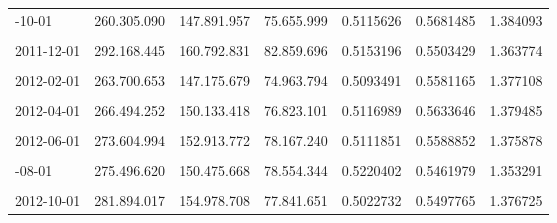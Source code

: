 \documentclass[12pt]{article}
\begin{document}
\begin{longtable}[t]{llllrrr}
\addlinespace
2011-10-01 & 260.305.090 & 147.891.957 & 75.655.999 & 0.5115626 & 0.5681485 & 1.384093\\
\cellcolor{gray!10}{2011-11-01} & \cellcolor{gray!10}{268.690.702} & \cellcolor{gray!10}{152.457.744} & \cellcolor{gray!10}{66.437.956} & \cellcolor{gray!10}{0.4357795} & \cellcolor{gray!10}{0.5674098} & \cellcolor{gray!10}{1.470900}\\
2011-12-01 & 292.168.445 & 160.792.831 & 82.859.696 & 0.5153196 & 0.5503429 & 1.363774\\
\cellcolor{gray!10}{2012-01-01} & \cellcolor{gray!10}{266.624.937} & \cellcolor{gray!10}{148.461.917} & \cellcolor{gray!10}{93.973.220} & \cellcolor{gray!10}{0.6329786} & \cellcolor{gray!10}{0.5568193} & \cellcolor{gray!10}{1.256857}\\
2012-02-01 & 263.700.653 & 147.175.679 & 74.963.794 & 0.5093491 & 0.5581165 & 1.377108\\
\addlinespace
\cellcolor{gray!10}{2012-03-01} & \cellcolor{gray!10}{265.172.466} & \cellcolor{gray!10}{148.173.897} & \cellcolor{gray!10}{84.957.558} & \cellcolor{gray!10}{0.5733639} & \cellcolor{gray!10}{0.5587831} & \cellcolor{gray!10}{1.313020}\\
2012-04-01 & 266.494.252 & 150.133.418 & 76.823.101 & 0.5116989 & 0.5633646 & 1.379485\\
\cellcolor{gray!10}{2012-05-01} & \cellcolor{gray!10}{267.179.533} & \cellcolor{gray!10}{149.788.445} & \cellcolor{gray!10}{74.271.966} & \cellcolor{gray!10}{0.4958458} & \cellcolor{gray!10}{0.5606284} & \cellcolor{gray!10}{1.394006}\\
2012-06-01 & 273.604.994 & 152.913.772 & 78.167.240 & 0.5111851 & 0.5588852 & 1.375878\\
\cellcolor{gray!10}{2012-07-01} & \cellcolor{gray!10}{273.823.647} & \cellcolor{gray!10}{152.516.010} & \cellcolor{gray!10}{82.319.912} & \cellcolor{gray!10}{0.5397460} & \cellcolor{gray!10}{0.5569863} & \cellcolor{gray!10}{1.344728}\\
\addlinespace
2012-08-01 & 275.496.620 & 150.475.668 & 78.554.344 & 0.5220402 & 0.5461979 & 1.353291\\
\cellcolor{gray!10}{2012-09-01} & \cellcolor{gray!10}{283.624.015} & \cellcolor{gray!10}{155.189.755} & \cellcolor{gray!10}{73.765.745} & \cellcolor{gray!10}{0.4753261} & \cellcolor{gray!10}{0.5471672} & \cellcolor{gray!10}{1.402690}\\
2012-10-01 & 281.894.017 & 154.978.708 & 77.841.651 & 0.5022732 & 0.5497765 & 1.376725\\

\end{longtable}
\end{document}
